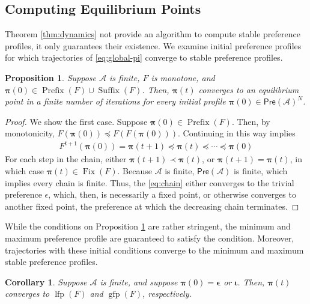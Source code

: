 \documentclass[conference]{ieeeconf}
\newcommand{\A}{\mathcal{A}}
\newcommand{\Pref}{\mathsf{Pre}}
\newcommand{\profile}{\boldsymbol{\pi}}
\DeclareMathOperator{\Fix}{Fix}
\DeclareMathOperator{\Pre}{Prefix}
\DeclareMathOperator{\Post}{Suffix}
\DeclareMathOperator{\lfp}{lfp}
\DeclareMathOperator{\gfp}{gfp}
\newtheorem{corollary}{Corollary}
\newtheorem{proposition}{Proposition}
\begin{document}
\subsection{Computing Equilibrium Points}

Theorem \ref{thm:dynamics} not provide an algorithm to compute stable preference profiles, it only guarantees their existence. We examine initial preference profiles for which trajectories of \eqref{eq:global-pi} converge to stable preference profiles.

\begin{proposition} \label{prop:initial-conditions}
    Suppose $\A$ is finite, $F$ is monotone, and $\profile(0) \in \Pre(F) \cup \Post(F)$. Then, $\profile(t)$ converges to an equilibrium point in a finite number of iterations for every initial profile $\profile(0) \in \Pref(\A)^N$.
\end{proposition}
\begin{proof}
    We show the first case. Suppose $\profile(0) \in \Pre(F)$. Then, by monotonicity, $F(\profile(0)) \preceq F\left( F(\profile(0))\right)$. Continuing in this way implies
    \begin{align}
        F^{t+1}\left( \profile(0)\right)  = \profile(t+1) \preceq \profile(t) \preceq \cdots \preceq \profile(0) \label{eq:chain}
    \end{align} For each step in the chain, either $\profile(t+1) \prec \profile(t)$, or $\profile(t+1) = \profile(t)$, in which case $\profile(t) \in \Fix(F)$. Because $\A$ is finite, $\Pref(\A)$ is finite, which implies every chain is finite. Thus, the \eqref{eq:chain} either converges to the trivial preference $\epsilon$, which, then, is necessarily a fixed point, or otherwise converges to another fixed point, the preference at which the decreasing chain terminates.
\end{proof}

While the conditions on Proposition \ref{prop:initial-conditions} are rather stringent, the minimum and maximum preference profile are guaranteed to satisfy the condition. Moreover, trajectories with these initial conditions converge to the minimum and maximum stable preference profiles.

\begin{corollary}
    Suppose $\A$ is finite, and suppose $\profile(0) = \boldsymbol{\epsilon}$ or $\boldsymbol{\iota}$. Then, $\profile(t)$ converges to $\lfp(F)$ and $\gfp(F)$, respectively.
\end{corollary}
\end{document}
